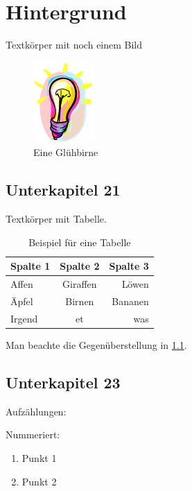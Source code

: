 \chapter{Hintergrund}
\label{chap:back}

Textkörper mit noch einem Bild

\begin{figure}[htbp]
	\centering
		\includegraphics{figures/birne}
	\caption{Eine Glühbirne}
	\label{fig:birne}
\end{figure}



\section{Unterkapitel 21}
\label{sec:Unterkapitel21}

Textkörper mit Tabelle.

\begin{table}[htbp]
	\centering
		\begin{tabular}{|l|c|r|}
		\hline
		\rowcolor[gray]{0.9}
		Spalte 1 & Spalte 2 & Spalte 3 \\
		\hline
		Affen & Giraffen & Löwen \\
		Äpfel & Birnen & Bananen \\
		Irgend & et & was \\
		\hline	
		\end{tabular}
	\caption{Beispiel für eine Tabelle}
	\label{tab:BeispielFuerEineTabelle}
\end{table}

Man beachte die Gegenüberstellung in \cref{tab:BeispielFuerEineTabelle}.

\section{Unterkapitel 23}
\label{sec:Unterkapite23}

Aufzählungen:

Nummeriert:

\begin{enumerate}
	\item Punkt 1
	\item Punkt 2
\end{enumerate}

